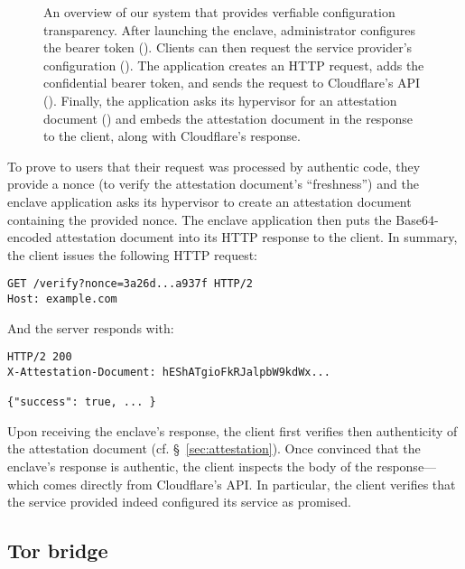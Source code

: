 \begin{figure}[t]
  \centering
  
  \caption{An overview of our system that provides verfiable configuration
  transparency.  After launching the enclave, administrator configures the
  bearer token ().  Clients can then request the service provider's
  configuration ().  The application creates an HTTP request, adds the
  confidential bearer token, and sends the request to Cloudflare's API
  ().  Finally, the application asks its hypervisor for an attestation
  document () and embeds the attestation document in the response to
  the client, along with Cloudflare's response.}
  \label{fig:vct}
\end{figure}

To prove to users that their request was processed by authentic code, they
provide a nonce (to verify the attestation document's ``freshness'') and the
enclave application asks its hypervisor to create an attestation document
containing the provided nonce.  The enclave application then puts the
Base64-encoded attestation document into its HTTP response to the client.  In
summary, the client issues the following HTTP request:

\begin{lstlisting}[numbers=none,basicstyle=\small\ttfamily]
GET /verify?nonce=3a26d...a937f HTTP/2
Host: example.com
\end{lstlisting}

And the server responds with:

\begin{lstlisting}[numbers=none,basicstyle=\small\ttfamily]
HTTP/2 200
X-Attestation-Document: hEShATgioFkRJalpbW9kdWx...

{"success": true, ... }
\end{lstlisting}

Upon receiving the enclave's response, the client first verifies then
authenticity of the attestation document (cf. \S~\ref{sec:attestation}).
Once convinced that the enclave's response is authentic, the client inspects the
body of the response---which comes directly from Cloudflare's API.  In
particular, the client verifies that the service provided indeed configured its
service as promised.


\subsection{Tor bridge}
\label{sec:tor-bridge}

